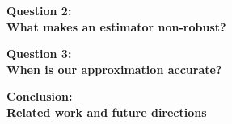 \documentclass[10pt]{beamer}
\begin{document}
\begin{frame}{}

{\Large \textbf{Question 2:} \\ \vspace{0.5em}
\textbf{What makes an estimator non-robust?}}

\end{frame}



\begin{frame}{}

{\Large \textbf{Question 3:} \\ \vspace{0.5em}
\textbf{When is our approximation accurate?}}

\end{frame}



\begin{frame}{}

{\Large \textbf{Conclusion: \\Related work and future directions} }

\end{frame}


\end{document}
